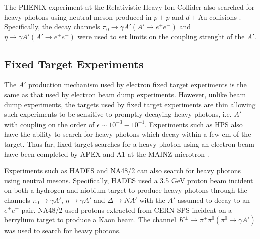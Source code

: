 The PHENIX experiment at the Relativistic Heavy Ion Collider also searched for
heavy photons using neutral meson produced in $p+p$  and $d+$Au collisions 
\cite{Adare:2014mgk}.
Specifically, the decay channels $\pi_0 \rightarrow \gamma A' (A' \rightarrow e^+e^-)$
and $\eta \rightarrow \gamma A' (A' \rightarrow e^+e^-)$ were used to set limits on the 
coupling strenght of the $A'$.

\subsection{Fixed Target Experiments}

The $A'$ production mechanism used by electron fixed target experiments is 
the same as that used by electron beam dump experiments. However, unlike beam
dump experiments, the targets used by fixed target experiments are thin allowing
such experiments to be sensitive to promptly decaying heavy photons, i.e. 
$A'$ with coupling on the order of $\epsilon \sim 10^{-3} - 10^{-1}$.
Experiments such as HPS also have the 
ability to search  for heavy photons which decay within a few cm of the target.
Thus far, fixed target searches for a heavy photon using an electron beam
have been completed by APEX \cite{Abrahamyan:2011gv} and A1 at the 
MAINZ microtron \cite{Merkel:2014avp}.

Experiments such as HADES \cite{Agakishiev:2013fwl} and NA48/2 \cite{Batley:2015lha}
can also search for heavy photons using 
neutral mesons.  Specifically, HADES used a 3.5 GeV proton beam incident on 
both a hydrogen and niobium target to produce heavy photons through the 
channels $\pi_0 \rightarrow \gamma A'$, $\eta \rightarrow \gamma A'$ and 
$\Delta \rightarrow N A'$ with the $A'$ assumed to decay to an $e^+e^-$ pair.
NA48/2 used protons extracted from CERN SPS incident on a berrylium target to 
produce a Kaon beam.  The channel $K^{\pm} \rightarrow \pi^{\pm}\pi^0 (\pi^0 \rightarrow \gamma A')$
was used to search for heavy photons.  
